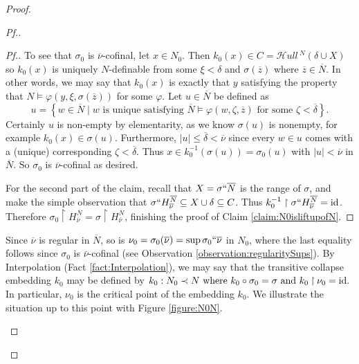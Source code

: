\documentclass{amsart}
\theoremstyle{definition}
\theoremstyle{remark}
\newcommand{\N}{{\overline{N}}}
\newcommand{\id}{\textup{\ensuremath{\text{id}}}}
\newcommand{\st}{\; | \;}
\newcommand{\set}[2]{\left\{#1\st #2 \right\}}
\newcommand{\rest}{\mathbin{\upharpoonright}}
\newcommand{\SH}{\mathcal{H}\textit{ull} \,}
\newcommand{\Sk}[3]{\SH^{#1}( {#2} \cup {#3} ) }
\begin{document}
\begin{proof}
\begin{proof}[Pf.]
\begin{proof}[Pf.]
To see that $\sigma_0$ is $\overline \nu$-cofinal, let $x \in N_0$. Then $k_0(x) \in C = \Sk{N}{\delta}{X}$ so $k_0(x)$ is uniquely $N$-definable from some $\xi < \delta$ and $\sigma(\overline z)$ where $\overline z \in \N$. In other words, we may say that $k_0(x)$ is exactly that  $y$ satisfying the property that $N \models \varphi(y, \xi, \sigma(\overline z))$ for some $\varphi$. Let $u \in \N$ be defined as 
	$$u=\set{ w \in \N }{\text{$w$ is unique satisfying $\N \models \varphi(w, \zeta, \overline z)$ for some $\zeta < \overline \delta$}}.$$
Certainly $u$ is non-empty by elementarity, as we know $\sigma(u)$ is nonempty, for example $k_0(x) \in \sigma(u)$.
Furthermore, $|u| \leq \overline \delta < \overline \nu$ since every $w \in u$ comes with a (unique) corresponding $\zeta<\overline \delta$.
Thus $x \in k_0^{-1}(\sigma(u))=\sigma_0(u)$ with $|u| < \overline \nu$ in $\N$. So $\sigma_0$ is $\overline \nu$-cofinal as desired. 

For the second part of the claim, recall that $X=\sigma``\N$ is the range of $\sigma$, and make the simple observation that $\sigma``H_{\overline \nu}^{\N} \subseteq X \cup \delta \subseteq C$. Thus $k_0^{-1} \upharpoonright \sigma``H_{\overline \nu}^{\overline N} = \text{id}$.
Therefore $\sigma_0 \rest H_{\overline \nu}^{\N}=\sigma \rest H_{\overline \nu}^{\overline N}$, finishing the proof of Claim \ref{claim:N0isliftupofN}.
\end{proof}

Since $\overline \nu$ is regular in $\N$, so is $\nu_0=\sigma_0(\overline \nu)=\sup \sigma_0``\overline \nu$ in $N_0$, where the last equality follows since $\sigma_0$ is $\overline \nu$-cofinal (see Observation \ref{observation:regularitySups}).
By Interpolation (Fact \ref{fact:Interpolation}), we may say that the transitive collapse embedding $k_0$ may be defined by 
	$k_0: N_0 \prec N \text{ where } k_0 \circ \sigma_0=\sigma \text{ and } k_0 \rest \nu_0 = \id.$
In particular, $\nu_0$ is the critical point of the embedding $k_0$. We illustrate the situation up to this point with Figure \ref{figure:N0N}. 

\begin{figure}[h!]
\end{figure}
\end{proof}
\end{proof}
\end{document}
